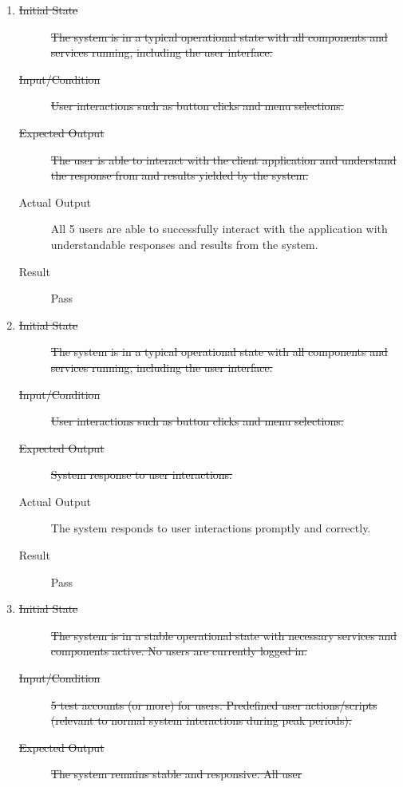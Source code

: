 \documentclass[12pt, titlepage]{article}
\begin{document}
\begin{enumerate}[NFR-T1]
  \item \label{NFRT1}
    \begin{description}
    \item[\sout{Initial State}]\sout{ The system is in a typical operational state with all
      components and services running, including the user interface.
    }\item[\sout{Input/Condition}]\sout{ User interactions such as button clicks and menu
      selections.
    }\item[\sout{Expected Output}]\sout{ The user is able to interact with the client application
      and understand the response from and results yielded by the system.
    }\item[Actual Output] All 5 users are able to successfully interact with the
      application with understandable responses and results from the system.
    \item[Result] Pass
    \end{description}
  \item \label{NFRT2}
    \begin{description}
    \item[\sout{Initial State}]\sout{ The system is in a typical operational state with all
      components and services running, including the user interface.
    }\item[\sout{Input/Condition}]\sout{ User interactions such as button clicks and menu
      selections.
    }\item[\sout{Expected Output}]\sout{ System response to user interactions.
    }\item[Actual Output] The system responds to user interactions promptly and
      correctly.
    \item[Result] Pass
    \end{description}
  \item \label{NFRT3}
    \begin{description}
    \item[\sout{Initial State}]\sout{ The system is in a stable operational state with necessary
      services and components active. No users are currently logged in.
    }\item[\sout{Input/Condition}]\sout{ 5 test accounts (or more) for users. Predefined user
      actions/scripts (relevant to normal system interactions during peak
      periods).
    }\item[\sout{Expected Output}]\sout{ The system remains stable and responsive. All user
}
\end{description}
\end{enumerate}
\end{document}
